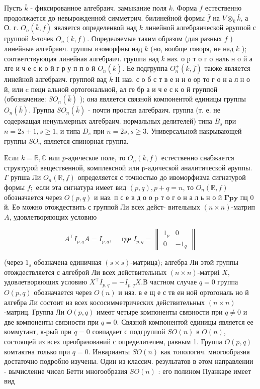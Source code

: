 \documentclass[10pt]{article}
\begin{document}
Пусть $\bar{k}$ - фиксированное алгебраич. замыкание поля $k$. Форма $f$ естественно продолжается до невырожденной симметрич. билинейной формы $\bar{f}$ на $V \otimes_{k} \bar{k}$, а О. г. $O_{n}(\bar{k}, f)$ является определенвой над $k$ линейной алгебраической әруппой с группой $k$-точек $O_{n}(k, f)$. Определяемые таким образом (для разных $f$ ) линейные алгебраич. группы изоморфны над $\bar{k}$ (но, вообще говоря, не над $k$ ); соответствующая линейная алгебраич. грушпа над $\bar{k}$ наз. о р т о г о наль н о й а лге и ч е с к о й г р у п п о й $O_{n}(\bar{k})$. Ее подгруппа $O_{n}^{+}(\bar{k}, \bar{f})$ также является линейной алгебраич. группой вад $\bar{k}$ ІІ наз. с о б с т в е н н о ор то г о н а л н о й, или c пеци альной ортогональной, ал ге бр а и ч е с к о й группой (обозначение: $S O_{n}(\bar{k})$ ); она является связной компонентой единицы группы $O_{n}(\bar{k})$. Группа $S O_{n}(\bar{k})$ - почти простая алгебраич. группа (т. е. не содержащая ненульмерных алгебраич. нормальных делителей) типа $B_{s}$ при $n=2 s+1, s \geqslant 1$, и типа $D_{s}$ при $n=2 s, s \geqslant 3$. Универсальной накрывающей группы $S O_{n}$ является спинорная группа.

Если $k=\mathbb{R}, \mathbb{C}$ или $p$-адическое поле, то $O_{n}(k, f)$ естественно снабжается структурой вещественной, комплексной или p-адической аналитической әруппы. $\Gamma$ рупша Ли $O_{n}(\mathbb{R}, f)$ определяется с точностью до ивоморфизма сигнатурой формы $f ;$ если эта сигнатура имеет вид $(p, q), p+q=n$, то $O_{n}(\mathbb{R}, f)$ обозначается через $O(p, q)$ и наз. п с е в д о о $\mathrm{p}$ т о г о н а л ь н о й $\mathbf{\Gamma} \mathbf{p} \mathbf{y}$ пц 0 й. Еө можно отождествить с группой Ли всех дейст- вительных $(n \times n)$-матрип $A$, удовлетворяющих условию

\[
A^{\top} I_{p, q} A=I_{p, q}, \quad \text { где } I_{p, q}=\left\|\begin{array}{cc}
1_{p} & 0 \\
0 & -1_{q}
\end{array}\right\|
\]

(через $1_{s}$ обозначена единичная $(s \times s)$-матрица); алгебра Ли этой группы отождествляется с алгеброй Ли всех действительных $(n \times n)$-матриі $X$, удовлетворяющих условию $X^{\top} I_{p, q}=-I_{p, q} X$.В частном случае $q=0$ группа $O(p, q)$ обозначается через $O(n)$ и няз. в е щ е с тв ен ной ортогональ но й алгебра Ли состоит из всех кососимметрических действительных $(n \times n)$-матриц. Группа Ли $O(p, q)$ имеөт четыре компоненты связности при $q \neq 0$ и две компоненты связности при $q=0$. Связной компонентой единицы является ее коммутант, к-рыӥ при $q=0$ совпадает с подгруппой $S O(n)$ в $O(n)$, состоящей из всех преобразований с определителем, равным 1. Группа $O(p, q)$ комтактна только при $q=0$. Инварианты $S O(n)$ как топологич. многообразия достаточно подробно изучены. Один из классич. результатов в әтом направлении - вычисление чисел Бетти многообразия $S O(n)$ : его полином Пуанкаре имеет вид
\end{document}
